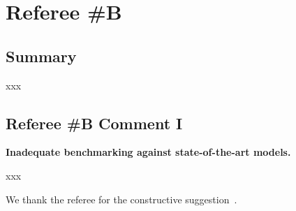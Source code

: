 

\section{Referee \#B}
\label{sec:rev:2}

\subsection{Summary}
xxx

\subsection{Referee \#B Comment I}

\textbf{Inadequate benchmarking against state-of-the-art models.}

xxx

\begin{response} 
\label{res:rev2:com1}

We thank the referee for the constructive suggestion~\cite{cgcnn}.

\end{response}
